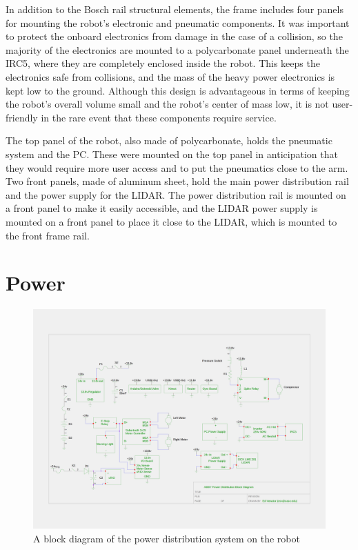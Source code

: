 \documentclass[]{cwru} %
\begin{document}
In addition to the Bosch rail structural elements, the frame includes
four panels for mounting the robot's electronic and pneumatic
components. It was important to protect the onboard electronics from
damage in the case of a collision, so the majority of the electronics
are mounted to a polycarbonate panel underneath the IRC5, where they are
completely enclosed inside the robot. This keeps the electronics safe
from collisions, and the mass of the heavy power electronics is kept low
to the ground. Although this design is advantageous in terms of keeping
the robot's overall volume small and the robot's center of mass low, it
is not user-friendly in the rare event that these components require
service.

The top panel of the robot, also made of polycarbonate, holds the
pneumatic system and the PC. These were mounted on the top panel in
anticipation that they would require more user access and to put the
pneumatics close to the arm. Two front panels, made of aluminum sheet,
hold the main power distribution rail and the power supply for the
LIDAR. The power distribution rail is mounted on a front panel to make
it easily accessible, and the LIDAR power supply is mounted on a front
panel to place it close to the LIDAR, which is mounted to the front
frame rail.

\section{Power}

\begin{figure}[h]
\centering
\includegraphics[width=6.0in]{power_block_diagram}
\caption{A block diagram of the power distribution system on the robot}
\label{fig:power-schematic}
\end{figure}
\end{document}
